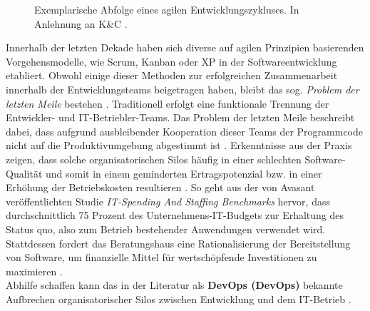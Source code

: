 \begin{center}
	\begin{figure}[H]\hspace*{-5mm}
		\centering
		\caption[Exemplarische Abfolge eines agilen Entwicklungszykluses]{Exemplarische Abfolge eines agilen Entwicklungszykluses. In Anlehnung an K\&C \cite{K&C.2021}.}
		\label{fig:Agile_Cycle}
	\end{figure}	
\end{center}
\vspace*{-15mm}
Innerhalb der letzten Dekade haben sich diverse auf agilen Prinzipien basierenden Vorgehensmodelle, wie Scrum, Kanban oder \ac{XP} in der Softwareentwicklung etabliert. Obwohl einige dieser Methoden zur erfolgreichen Zusammenarbeit innerhalb der Entwicklungsteams beigetragen haben, bleibt das sog.  \textit{Problem der letzten Meile} bestehen \cite{Qentelli.20230305}. Traditionell erfolgt eine funktionale Trennung der Entwickler- und IT-Betriebler-Teams. Das Problem der letzten Meile beschreibt dabei, dass aufgrund ausbleibender Kooperation dieser Teams der Programmcode nicht auf die Produktivumgebung abgestimmt ist \cite[17]{Huttermann.2012}. Erkenntnisse aus der Praxis zeigen, dass solche organisatorischen Silos häufig in einer schlechten Software-Qualität und somit in einem geminderten Ertragspotenzial bzw. in einer Erhöhung der Betriebskosten resultieren \cite[1]{Halstenberg.2020}. So geht aus der von Avasant veröffentlichten Studie \textit{IT-Spending And Staffing Benchmarks} hervor, dass durchschnittlich 75 Prozent des Unternehmens-IT-Budgets zur Erhaltung des Status quo, also zum Betrieb bestehender Anwendungen verwendet wird. Stattdessen fordert das Beratungshaus eine Rationalisierung der Bereitstellung von Software, um finanzielle Mittel für wertschöpfende Investitionen zu maximieren \cite[6]{Avasant.20220728}.\\ Abhilfe schaffen kann das in der Literatur als \textbf{\acl{DevOps} (Dev\-Ops)} bekannte Aufbrechen organisatorischer Silos zwischen Entwicklung und dem IT-Betrieb \cite[1]{Halstenberg.2020}. 
